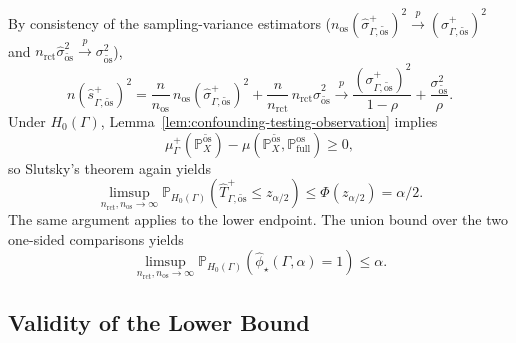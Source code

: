 By consistency of the sampling-variance estimators (\(n_{\mathrm{os}}(\widehat{\sigma}^+_{\Gamma,\widetilde{\mathrm{os}}})^2 \xrightarrow{p} (\sigma^+_{\Gamma,\widetilde{\mathrm{os}}})^2\) and \(n_{\mathrm{rct}}\widehat{\sigma}_{\widetilde{\mathrm{os}}}^2 \xrightarrow{p} \sigma_{\widetilde{\mathrm{os}}}^2\)),
\[
  n(\widehat{s}^+_{\Gamma,\widetilde{\mathrm{os}}})^2
  =
  \frac{n}{n_{\mathrm{os}}}\,n_{\mathrm{os}}(\widehat{\sigma}^+_{\Gamma,\widetilde{\mathrm{os}}})^2
  +
  \frac{n}{n_{\mathrm{rct}}}\,n_{\mathrm{rct}}\widehat{\sigma}_{\widetilde{\mathrm{os}}}^2
  \xrightarrow{p}
  \frac{(\sigma^+_{\Gamma,\widetilde{\mathrm{os}}})^2}{1-\rho}
  +
  \frac{\sigma_{\widetilde{\mathrm{os}}}^2}{\rho}.
\]
Under \(H_0(\Gamma)\), Lemma~\ref{lem:confounding-testing-observation} implies
\[
  \mu^+_{\Gamma}(\mathbb{P}^{\widetilde{\mathrm{os}}}_X)
  -
  \mu(\mathbb{P}^{\widetilde{\mathrm{os}}}_X,\mathbb{P}^{\mathrm{os}}_{\mathrm{full}})
  \geq
  0,
\]
so Slutsky's theorem again yields
\[
  \limsup_{n_{\mathrm{rct}},n_{\mathrm{os}}\to\infty}
  \mathbb{P}_{H_0(\Gamma)}
  \left(
    \widehat{T}^+_{\Gamma,\widetilde{\mathrm{os}}}
    \leq
    z_{\alpha/2}
  \right)
  \leq
  \Phi(z_{\alpha/2})
  =
  \alpha/2.
\]
The same argument applies to the lower endpoint. The union bound over the two one-sided comparisons yields
\[
  \limsup_{n_{\mathrm{rct}},n_{\mathrm{os}}\to\infty}
  \mathbb{P}_{H_0(\Gamma)}
  \left(
    \widehat{\phi}_{\star}(\Gamma,\alpha)=1
  \right)
  \leq
  \alpha.
\]

\subsection{Validity of the Lower Bound}
\label{app:confounding-proof-lower-bound}

